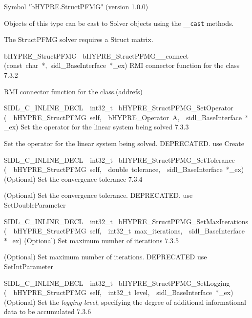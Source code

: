 \documentclass{article}
\begin{document}
\begin{cxxentry}
\begin{cxxentry}
\begin{cxxvariable}
\begin{cxxdoc}
Symbol "bHYPRE.StructPFMG" (version 1.0.0)

Objects of this type can be cast to Solver objects
using the {\tt \_\_cast} methods.

The StructPFMG solver requires a Struct matrix.
\end{cxxdoc}
\end{cxxvariable}
\begin{cxxfunction}
{bHYPRE\_StructPFMG\ }
        {bHYPRE\_StructPFMG\_\_connect}
        {(const\ char\ *,\ sidl\_BaseInterface\ *\_ex)}
        {
RMI connector function for the class}
        {7.3.2}
\begin{cxxdoc}

RMI connector function for the class.(addrefs)
\end{cxxdoc}
\end{cxxfunction}
\begin{cxxfunction}
{SIDL\_C\_INLINE\_DECL\ \ int32\_t\ }
        {bHYPRE\_StructPFMG\_SetOperator}
        {(\ \ bHYPRE\_StructPFMG\ self,\ \ bHYPRE\_Operator\ A,\ \ sidl\_BaseInterface\ *\_ex)}
        {
Set the operator for the linear system being solved}
        {7.3.3}
\begin{cxxdoc}

Set the operator for the linear system being solved.
DEPRECATED.  use Create
\end{cxxdoc}
\end{cxxfunction}
\begin{cxxfunction}
{SIDL\_C\_INLINE\_DECL\ \ int32\_t\ }
        {bHYPRE\_StructPFMG\_SetTolerance}
        {(\ \ bHYPRE\_StructPFMG\ self,\ \ double\ tolerance,\ \ sidl\_BaseInterface\ *\_ex)}
        {
(Optional) Set the convergence tolerance}
        {7.3.4}
\begin{cxxdoc}

(Optional) Set the convergence tolerance.
DEPRECATED.  use SetDoubleParameter
\end{cxxdoc}
\end{cxxfunction}
\begin{cxxfunction}
{SIDL\_C\_INLINE\_DECL\ \ int32\_t\ }
        {bHYPRE\_StructPFMG\_SetMaxIterations}
        {(\ \ bHYPRE\_StructPFMG\ self,\ \ int32\_t\ max\_iterations,\ \ sidl\_BaseInterface\ *\_ex)}
        {
(Optional) Set maximum number of iterations}
        {7.3.5}
\begin{cxxdoc}

(Optional) Set maximum number of iterations.
DEPRECATED   use SetIntParameter
\end{cxxdoc}
\end{cxxfunction}
\begin{cxxfunction}
{SIDL\_C\_INLINE\_DECL\ \ int32\_t\ }
        {bHYPRE\_StructPFMG\_SetLogging}
        {(\ \ bHYPRE\_StructPFMG\ self,\ \ int32\_t\ level,\ \ sidl\_BaseInterface\ *\_ex)}
        {
(Optional) Set the {\it logging level}, specifying the degree
of additional informational data to be accumulated}
        {7.3.6}
\begin{cxxdoc}


\end{cxxdoc}
\end{cxxfunction}
\end{cxxentry}
\end{cxxentry}
\end{document}
